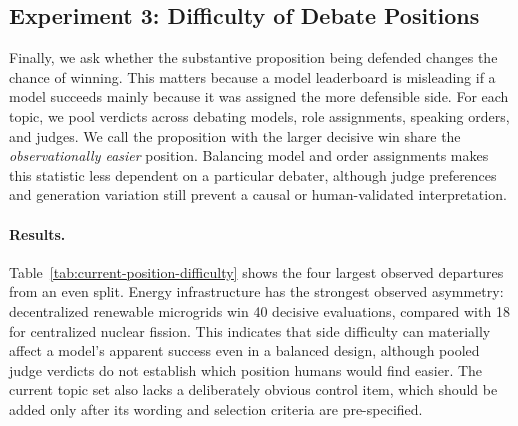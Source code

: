 \documentclass{article}
\begin{document}

\subsection{Experiment 3: Difficulty of Debate Positions}

Finally, we ask whether the substantive proposition being defended changes the chance of winning. This matters because a model leaderboard is misleading if a model succeeds mainly because it was assigned the more defensible side. For each topic, we pool verdicts across debating models, role assignments, speaking orders, and judges. We call the proposition with the larger decisive win share the \emph{observationally easier} position. Balancing model and order assignments makes this statistic less dependent on a particular debater, although judge preferences and generation variation still prevent a causal or human-validated interpretation.

\paragraph{Results.}
Table~\ref{tab:current-position-difficulty} shows the four largest observed departures from an even split. Energy infrastructure has the strongest observed asymmetry: decentralized renewable microgrids win 40 decisive evaluations, compared with 18 for centralized nuclear fission. This indicates that side difficulty can materially affect a model's apparent success even in a balanced design, although pooled judge verdicts do not establish which position humans would find easier. The current topic set also lacks a deliberately obvious control item, which should be added only after its wording and selection criteria are pre-specified.
\end{document}
